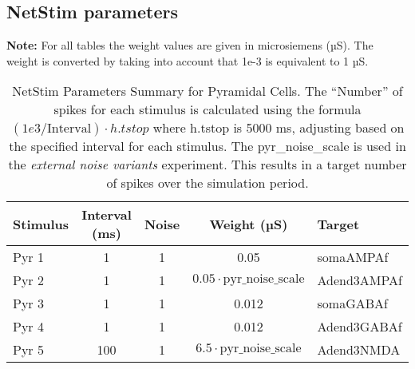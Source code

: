 \subsection{NetStim parameters}
\textbf{Note:} For all tables the weight values are given in microsiemens (µS).
The weight is converted by taking into account that 1e-3 is equivalent to 1 µS.
\begin{table}[htbp]
    \centering
    \caption[NetStim Parameters Pyramidal cells]{NetStim Parameters Summary for Pyramidal Cells.
        The ``Number'' of spikes for each stimulus is calculated using the formula \((1e3 / \text{Interval}) \cdot h.tstop\) where h.tstop is 5000 ms,
        adjusting based on the specified interval for each stimulus.
        The pyr\_noise\_scale is used in the \textit{external noise variants} experiment.
        This results in a target number of spikes over the simulation period.}
    \begin{tabular}{lcccl}
        \hline
        \textbf{Stimulus} & \textbf{Interval (ms)} & \textbf{Noise} & \textbf{Weight (µS)}                    & \textbf{Target} \\
        \hline
        Pyr 1             & 1                      & 1              & 0.05                                    & somaAMPAf       \\
        Pyr 2             & 1                      & 1              & \(0.05 \cdot \text{pyr\_noise\_scale}\) & Adend3AMPAf     \\
        Pyr 3             & 1                      & 1              & 0.012                                   & somaGABAf       \\
        Pyr 4             & 1                      & 1              & 0.012                                   & Adend3GABAf     \\
        Pyr 5             & 100                    & 1              & \(6.5 \cdot \text{pyr\_noise\_scale}\)  & Adend3NMDA      \\ \hline
    \end{tabular}
\end{table}\label{table:netstimparams_pyr}

